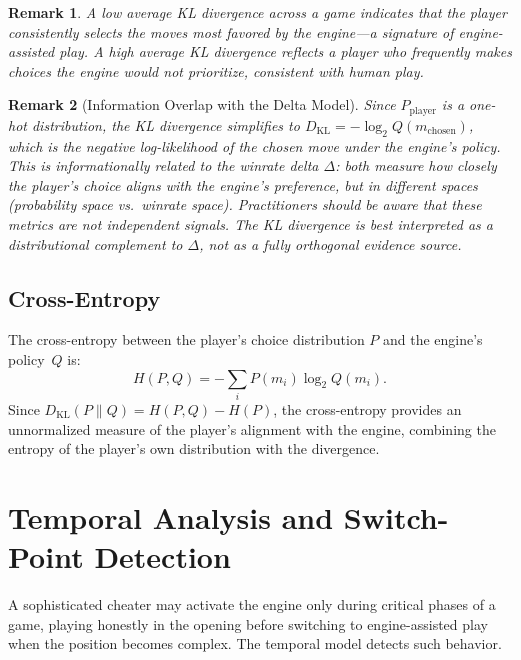\documentclass[11pt,a4paper]{article}
\newtheorem{remark}{Remark}
\begin{document}
\begin{remark}
A \emph{low average KL divergence} across a game indicates that the player
consistently selects the moves most favored by the engine---a signature of
engine-assisted play. A high average KL divergence reflects a player who
frequently makes choices the engine would not prioritize, consistent with
human play.
\end{remark}

\begin{remark}[Information Overlap with the Delta Model]
\label{rem:overlap}
Since $P_{\text{player}}$ is a one-hot distribution, the KL divergence
simplifies to $D_{\text{KL}} = -\log_2 Q(m_{\text{chosen}})$, which is
the negative log-likelihood of the chosen move under the engine's policy.
This is informationally related to the winrate delta $\Delta$: both measure
how closely the player's choice aligns with the engine's preference, but in
different spaces (probability space vs.\ winrate space). Practitioners
should be aware that these metrics are \emph{not independent} signals.
The KL divergence is best interpreted as a distributional complement to
$\Delta$, not as a fully orthogonal evidence source.
\end{remark}

\subsection{Cross-Entropy}

The cross-entropy between the player's choice distribution $P$ and the engine's
policy~$Q$ is:
\begin{equation}
    H(P, Q) = -\sum_{i} P(m_i) \log_2 Q(m_i).
    \label{eq:cross_entropy}
\end{equation}
Since $D_{\text{KL}}(P \| Q) = H(P, Q) - H(P)$, the cross-entropy provides
an unnormalized measure of the player's alignment with the engine, combining
the entropy of the player's own distribution with the divergence.


\section{Temporal Analysis and Switch-Point Detection}
\label{sec:temporal}

A sophisticated cheater may activate the engine only during critical phases of
a game, playing honestly in the opening before switching to engine-assisted
play when the position becomes complex. The temporal model detects such
behavior.
\end{document}
